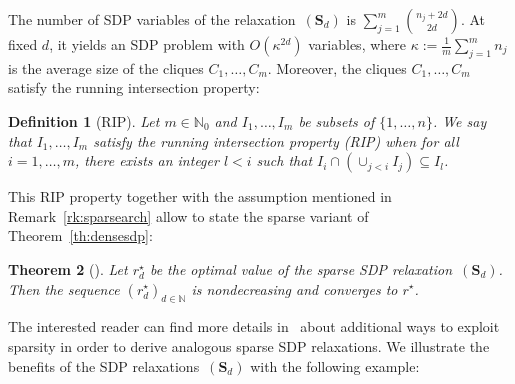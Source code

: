 \documentclass[preprint,fleqn,nocopyrightspace]{sigplanconf}
\newcommand{\N}{\mathbb{N}}
\def\S{\mathbf{S}}
\def\S{\mathbf{S}}
\newtheorem{theorem}{Theorem}[section]
\theoremstyle{plain}
\newtheorem{definition}[theorem]{Definition}
\begin{document}
The number of SDP variables of the relaxation~$(\S_d)$ is $\sum_{j=1}^m \binom{n_j + 2 d}{2 d}$. At fixed $d$, it yields an SDP problem with $O(\kappa^{2d})$ variables, where $\kappa := \frac{1}{m} \sum_{j=1}^m n_j$ is the average size of the cliques $C_1, \dots, C_m$.
%
Moreover, the cliques $C_1, \dots, C_m$ satisfy the running intersection property: 
%
\begin{definition}[RIP]
\label{def:rip}
Let $m \in \N_0$  and $I_1, \dots, I_m$ be subsets of $\{1, \dots, n\}$. We say that $I_1, \dots, I_m$ satisfy the running intersection property (RIP) when for all $i=1, \dots, m$, there exists an integer $l < i$ such that $I_i \cap (\cup_{j < i} I_j) \subseteq I_l$.
\end{definition}
This RIP property together with the assumption mentioned in Remark~\ref{rk:sparsearch} allow to state the sparse variant of Theorem~\ref{th:densesdp}:
%
\begin{theorem}[]
\label{th:sparsesdp}
Let $r_d^{\star}$ be the optimal value of the sparse SDP relaxation~$(\S_d)$. Then the sequence $(r_d^{\star})_{d \in \N}$ is nondecreasing and converges to $r^\star$.
\end{theorem}
The interested reader can find more details in~\cite{Waki06SparseSOS} about additional ways to exploit sparsity in order to derive analogous sparse SDP relaxations.
We illustrate the benefits of the SDP relaxations~$(\S_d)$ with the following example:
\end{document}
